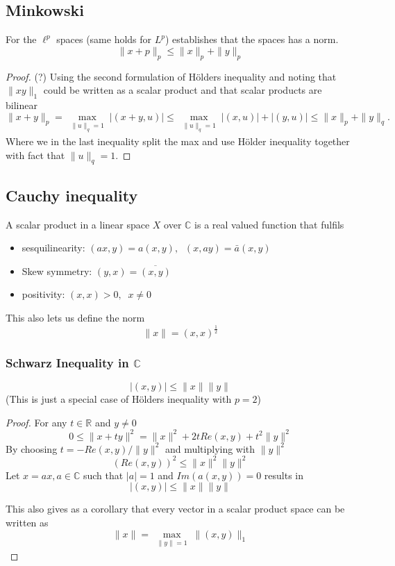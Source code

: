 \documentclass[titlepage]{article}
\begin{document}
\subsection{Minkowski}
For the $\ell^p$ spaces (same holds for $L^p$) establishes that the spaces has a norm.
$$\|x+p\|_p \leq\|x\|_p+ \|y\|_p$$
\begin{proof}
(?)
Using the second formulation of Hölders inequality and noting that $\|xy\|_1$ could be written as a scalar product and that scalar products are bilinear
$$\|x+y\|_p = \max\limits_{\substack{\|u\|_q = 1}}|(x+y,u)| \leq
\max\limits_{\substack{\|u\|_q = 1}}|(x,u)|+ |(y,u)| \leq \|x\|_p +\|y\|_q.$$
Where we in the last inequality split the max and use Hölder inequality together with fact that $\|u\|_q = 1.$
\end{proof}
\subsection{Cauchy inequality}
A scalar product in a linear space $X$ over  $\mathbb{C}$ is a real valued function that fulfils 
\begin{itemize}
\item sesquilinearity: $(ax,y) = a(x,y),\;\; (x,ay) = \bar{a}(x,y)$ 
\item Skew symmetry: $(y,x) =  \overline{(x,y)}$ 
\item positivity: $(x,x) > 0,  \;\; x\neq 0$ 
\end{itemize}
This also lets us define the norm  
$$\|x\| = (x,x)^{\frac{1}{2}}$$

\subsubsection{Schwarz Inequality in $\mathbb{C}$}
$$|(x,y)| \leq \|x\|\|y\|$$
(This is just a special case of Hölders inequality with $p= 2$)
\begin{proof}
For any $t \in \mathbb{R}$ and $y\neq 0$
\begin{equation}
0\leq \|x+ty\|^2 = \|x\|^2 + 2tRe(x,y) + t^2\|y\|^2 
\label{scalar}
\end{equation}
By choosing $t = -Re(x,y)/\|y\|^2$ and multiplying with $\|y\|^2$
\begin{equation}
\left(Re(x,y)\right)^2 \leq \|x\|^2\|y\|^2
\end{equation}
Let $x = ax, a\in \mathbb{C}$ such that $|a| = 1$ and $Im(a(x,y)) = 0$
results in
\begin{equation}
|(x,y)| \leq \|x\|\|y\|
\end{equation} 

This also gives as a corollary that every vector in a scalar product space can be written as 
$$ \|x\| = \max\limits_{\substack{\|y\| = 1}}\|(x,y)\|_1$$

\end{proof}
\end{document}
